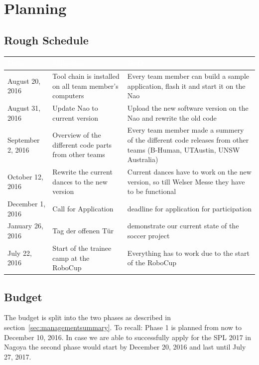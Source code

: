 \documentclass[12pt]{article}
\theoremstyle{definition}
\begin{document}
\section{Planning}
\subsection{Rough Schedule}

\begin{tabular}{|p{}|p{}|p{}|}
\hline
\cellcolor[gray]{0.5}\textcolor{white}{Date} & \cellcolor[gray]{0.45}\textcolor{white}{Milestone} & \cellcolor[gray]{0.5}\textcolor{white}{DoD} \\ \hline
August 20, 2016 & Tool chain is installed on all team member's computers & Every team member can build a sample application, flash it and start it on the Nao \\ \hline
August 31, 2016 & Update Nao to current version & Upload the new software version on the Nao and rewrite the old code \\ \hline
September 2, 2016 & Overview of the different code parts from other teams & Every team member made a summery of the different code releases from other teams (B-Human, UTAustin, UNSW Australia) \\ \hline
October 12, 2016 & Rewrite the current dances to the new version & Current dances have to work on the new version, so till Welser Messe they have to be functional \\ \hline
December 1, 2016 & Call for Application & deadline for application for participation \\ \hline
January 26, 2016 & Tag der offenen Tür & demonstrate our current state of the soccer project \\ \hline
July 22, 2016 & Start of the trainee camp at the RoboCup & Everything has to work due to the start of the RoboCup\\ \hline
\end{tabular}


\subsection{Budget}\label{sec:budget}
The budget is split into the two phases as described in section~\ref{sec:managementsummary}. To recall: Phase 1 is planned from now to December 10, 2016. In case we are able to successfully apply for the SPL 2017 in Nagoya the second phase would start by December 20, 2016 and last until July 27, 2017.
\end{document}
